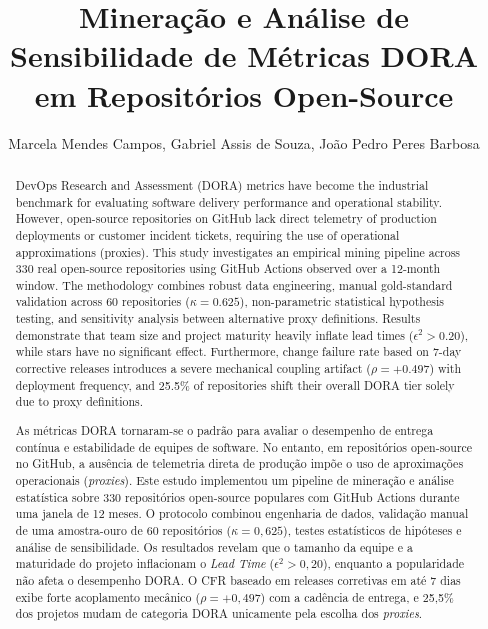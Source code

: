 \documentclass[12pt]{article}
\title{Mineração e Análise de Sensibilidade de Métricas DORA em Repositórios Open-Source}
\author{Marcela Mendes Campos\inst{1}, Gabriel Assis de Souza\inst{1}, João Pedro Peres Barbosa\inst{1}}
\newenvironment{resumo}{\begin{abstract}\renewcommand{\abstractname}{Resumo}}{\end{abstract}}
\begin{document}
 

\maketitle

\begin{abstract}
DevOps Research and Assessment (DORA) metrics have become the industrial benchmark for evaluating software delivery performance and operational stability. However, open-source repositories on GitHub lack direct telemetry of production deployments or customer incident tickets, requiring the use of operational approximations (proxies). This study investigates an empirical mining pipeline across 330 real open-source repositories using GitHub Actions observed over a 12-month window. The methodology combines robust data engineering, manual gold-standard validation across 60 repositories ($\kappa = 0.625$), non-parametric statistical hypothesis testing, and sensitivity analysis between alternative proxy definitions. Results demonstrate that team size and project maturity heavily inflate lead times ($\epsilon^2 > 0.20$), while stars have no significant effect. Furthermore, change failure rate based on 7-day corrective releases introduces a severe mechanical coupling artifact ($\rho = +0.497$) with deployment frequency, and 25.5\% of repositories shift their overall DORA tier solely due to proxy definitions.
\end{abstract}

\begin{resumo}
As métricas DORA tornaram-se o padrão para avaliar o desempenho de entrega contínua e estabilidade de equipes de software. No entanto, em repositórios open-source no GitHub, a ausência de telemetria direta de produção impõe o uso de aproximações operacionais (\textit{proxies}). Este estudo implementou um pipeline de mineração e análise estatística sobre 330 repositórios open-source populares com GitHub Actions durante uma janela de 12 meses. O protocolo combinou engenharia de dados, validação manual de uma amostra-ouro de 60 repositórios ($\kappa = 0{,}625$), testes estatísticos de hipóteses e análise de sensibilidade. Os resultados revelam que o tamanho da equipe e a maturidade do projeto inflacionam o \textit{Lead Time} ($\epsilon^2 > 0{,}20$), enquanto a popularidade não afeta o desempenho DORA. O CFR baseado em releases corretivas em até 7 dias exibe forte acoplamento mecânico ($\rho = +0{,}497$) com a cadência de entrega, e 25{,}5\% dos projetos mudam de categoria DORA unicamente pela escolha dos \textit{proxies}.
\end{resumo}
\end{document}
